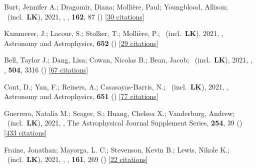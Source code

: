 \item[{\color{numcolor}\scriptsize57}] Burt, Jennifer A.; Dragomir, Diana; Molli{\`e}re, Paul; Youngblood, Allison; \etal\ (incl.\ \textbf{LK}), 2021, , \aj, \textbf{162}, 87 () [\href{https://ui.adsabs.harvard.edu/abs/2021AJ....162...87B}{30 citations}]

\item[{\color{numcolor}\scriptsize56}] Kammerer, J.; Lacour, S.; Stolker, T.; Molli{\`e}re, P.; \etal\ (incl.\ \textbf{LK}), 2021, , Astronomy and Astrophysics, \textbf{652} () [\href{https://ui.adsabs.harvard.edu/abs/2021A&A...652A..57K}{29 citations}]

\item[{\color{numcolor}\scriptsize55}] Bell, Taylor J.; Dang, Lisa; Cowan, Nicolas B.; Bean, Jacob; \etal\ (incl.\ \textbf{LK}), 2021, , \mnras, \textbf{504}, 3316 () [\href{https://ui.adsabs.harvard.edu/abs/2021MNRAS.504.3316B}{67 citations}]

\item[{\color{numcolor}\scriptsize54}] Cont, D.; Yan, F.; Reiners, A.; Casasayas-Barris, N.; \etal\ (incl.\ \textbf{LK}), 2021, , Astronomy and Astrophysics, \textbf{651} () [\href{https://ui.adsabs.harvard.edu/abs/2021A&A...651A..33C}{77 citations}]

\item[{\color{numcolor}\scriptsize53}] Guerrero, Natalia M.; Seager, S.; Huang, Chelsea X.; Vanderburg, Andrew; \etal\ (incl.\ \textbf{LK}), 2021, , The Astrophysical Journal Supplement Series, \textbf{254}, 39 () [\href{https://ui.adsabs.harvard.edu/abs/2021ApJS..254...39G}{433 citations}]

\item[{\color{numcolor}\scriptsize52}] Fraine, Jonathan; Mayorga, L. C.; Stevenson, Kevin B.; Lewis, Nikole K.; \etal\ (incl.\ \textbf{LK}), 2021, , \aj, \textbf{161}, 269 () [\href{https://ui.adsabs.harvard.edu/abs/2021AJ....161..269F}{22 citations}]

